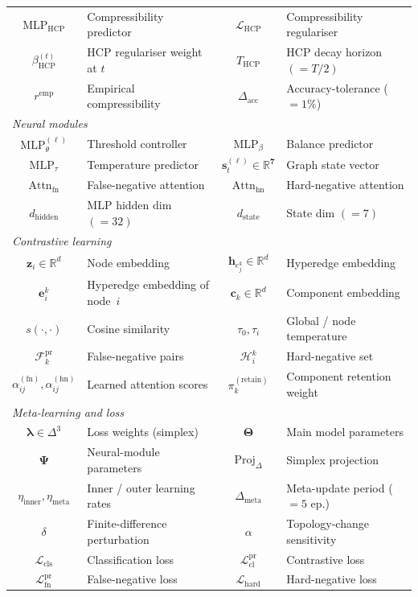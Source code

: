 \documentclass[10pt]{article}
\theoremstyle{plain}
\theoremstyle{definition}
\begin{document}
\begin{table}[ht!]
\begin{tabular}{cl|cl}
$\mathrm{MLP}_{\mathrm{HCP}}$ & Compressibility predictor
  & $\mathcal{L}_{\mathrm{HCP}}$ & Compressibility regulariser \\
$\beta_{\mathrm{HCP}}^{(t)}$ & HCP regulariser weight at $t$
  & $T_{\mathrm{HCP}}$ & HCP decay horizon $(=\!T/2)$ \\
$r^{\mathrm{emp}}$ & Empirical compressibility
  & $\Delta_{\mathrm{acc}}$ & Accuracy-tolerance ($=1\%$) \\
\midrule
\multicolumn{4}{l}{\textit{Neural modules}} \\
$\mathrm{MLP}_\theta^{(\ell)}$ & Threshold controller
  & $\mathrm{MLP}_\beta$ & Balance predictor \\
$\mathrm{MLP}_\tau$ & Temperature predictor
  & $\mathbf{s}_t^{(\ell)}\!\in\!\mathbb{R}^{\mathbf{7}}$
  & Graph state vector \\
$\mathrm{Attn}_{\mathrm{fn}}$ & False-negative attention
  & $\mathrm{Attn}_{\mathrm{hn}}$ & Hard-negative attention \\
$d_{\mathrm{hidden}}$ & MLP hidden dim $(=32)$
  & $d_{\mathrm{state}}$ & State dim $(=7)$ \\
\midrule
\multicolumn{4}{l}{\textit{Contrastive learning}} \\
$\mathbf{z}_i\!\in\!\mathbb{R}^{d}$ & Node embedding
  & $\mathbf{h}_{e_j^{k}}\!\in\!\mathbb{R}^{d}$ & Hyperedge
    embedding \\
$\mathbf{e}_i^{k}$ & Hyperedge embedding of node~$i$
  & $\mathbf{c}_k\!\in\!\mathbb{R}^{d}$ & Component embedding \\
$s(\cdot,\cdot)$ & Cosine similarity
  & $\tau_0,\tau_i$ & Global / node temperature \\
$\mathcal{F}_k^{\mathrm{pr}}$ & False-negative pairs
  & $\mathcal{H}_i^{k}$ & Hard-negative set \\
$\alpha_{ij}^{(\mathrm{fn})},\alpha_{ij}^{(\mathrm{hn})}$ &
  Learned attention scores
  & $\pi_k^{(\mathrm{retain})}$ & Component retention weight \\
\midrule
\multicolumn{4}{l}{\textit{Meta-learning and loss}} \\
$\boldsymbol{\lambda}\!\in\!\Delta^{3}$ & Loss weights (simplex)
  & $\boldsymbol{\Theta}$ & Main model parameters \\
$\boldsymbol{\Psi}$ & Neural-module parameters
  & $\mathrm{Proj}_{\Delta}$ & Simplex projection \\
$\eta_{\mathrm{inner}},\eta_{\mathrm{meta}}$ & Inner / outer
  learning rates
  & $\Delta_{\mathrm{meta}}$ & Meta-update period ($=5$ ep.) \\
$\delta$ & Finite-difference perturbation
  & $\alpha$ & Topology-change sensitivity \\
$\mathcal{L}_{\mathrm{cls}}$ & Classification loss
  & $\mathcal{L}_{\mathrm{cl}}^{\mathrm{pr}}$ & Contrastive loss \\
$\mathcal{L}_{\mathrm{fn}}^{\mathrm{pr}}$ & False-negative loss
  & $\mathcal{L}_{\mathrm{hard}}$ & Hard-negative loss \\
\bottomrule
\end{tabular}
\end{table}
\end{document}
